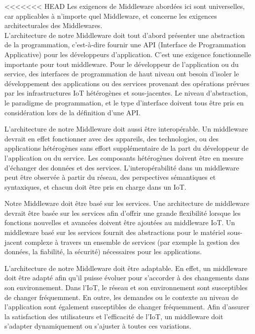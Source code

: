 <<<<<<< HEAD
Les exigences de Middleware abordées ici sont universelles, car applicables à n'importe quel Middleware, et concerne les exigences architecturales des Middlewares.
\\

L'architecture de notre Middleware doit tout d'abord présenter une abstraction de la programmation, c'est-à-dire fournir une API (Interface de Programmation Applicative) pour les développeurs d'application. C'est une exigence fonctionnelle importante pour tout middleware. Pour le développeur de l'application ou du service, des interfaces de programmation de haut niveau ont besoin d'isoler le développement des applications ou des services provenant des opérations prévues par les infrastructures IoT hétérogènes et sous-jacentes. Le niveau d'abstraction, le paradigme de programmation, et le type d'interface doivent tous être pris en considération lors de la définition d'une API.

L'architecture de notre Middleware doit aussi être interopérable. Un middleware devrait en effet fonctionner avec des appareils, des technologies, ou des applications hétérogènes sans effort supplémentaire de la part du développeur de l'application ou du service. Les composants hétérogènes doivent être en mesure d'échanger des données et des services. L'interopérabilité dans un middleware peut être observée à partir du réseau, des perspectives sémantiques et syntaxiques, et chacun doit être pris en charge dans un IoT.

Notre Middleware doit être basé sur les services. Une architecture de middleware devrait être basée sur les services afin d’offrir une grande flexibilité lorsque les fonctions nouvelles et avancées doivent être ajoutées au middleware IoT. Un middleware basé sur les services fournit des abstractions pour le matériel sous-jacent complexe à travers un ensemble de services (par exemple la gestion des données, la fiabilité, la sécurité) nécessaires pour les applications.

L'architecture de notre Middleware doit être adaptable. En effet, un middleware doit être adapté afin qu'il puisse évoluer pour s'accorder à des changements dans son environnement. Dans l'IoT, le réseau et son environnement sont susceptibles de changer fréquemment. En outre, les demandes ou le contexte au niveau de l'application sont également susceptibles de changer fréquemment. Afin d'assurer la satisfaction des utilisateurs et l'efficacité de l'IoT, un middleware doit s’adapter dynamiquement ou s'ajuster à toutes ces variations.

